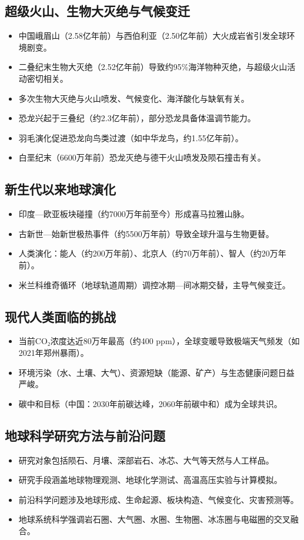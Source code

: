 \documentclass[12pt,a4paper]{article}
\begin{document}
	\subsection{超级火山、生物大灭绝与气候变迁}
	\begin{itemize}
		\item 中国峨眉山（2.58亿年前）与西伯利亚（2.50亿年前）大火成岩省引发全球环境剧变。
		\item 二叠纪末生物大灭绝（2.52亿年前）导致约95\%海洋物种灭绝，与超级火山活动密切相关。
		\item 多次生物大灭绝与火山喷发、气候变化、海洋酸化与缺氧有关。
		\item 恐龙兴起于三叠纪（约2.3亿年前），部分恐龙具备体温调节能力。
		\item 羽毛演化促进恐龙向鸟类过渡（如中华龙鸟，约1.55亿年前）。
		\item 白垩纪末（6600万年前）恐龙灭绝与德干火山喷发及陨石撞击有关。
	\end{itemize}
	
	\subsection{新生代以来地球演化}
	\begin{itemize}
		\item 印度—欧亚板块碰撞（约7000万年前至今）形成喜马拉雅山脉。
		\item 古新世—始新世极热事件（约5500万年前）导致全球升温与生物更替。
		\item 人类演化：能人（约200万年前）、北京人（约70万年前）、智人（约20万年前）。
		\item 米兰科维奇循环（地球轨道周期）调控冰期—间冰期交替，主导气候变迁。
	\end{itemize}
	
	\subsection{现代人类面临的挑战}
	\begin{itemize}
		\item 当前CO₂浓度达近80万年最高（约400 ppm），全球变暖导致极端天气频发（如2021年郑州暴雨）。
		\item 环境污染（水、土壤、大气）、资源短缺（能源、矿产）与生态健康问题日益严峻。
		\item 碳中和目标（中国：2030年前碳达峰，2060年前碳中和）成为全球共识。
	\end{itemize}
	
	\subsection{地球科学研究方法与前沿问题}
	\begin{itemize}
		\item 研究对象包括陨石、月壤、深部岩石、冰芯、大气等天然与人工样品。
		\item 研究手段涵盖地球物理观测、地球化学测试、高温高压实验与计算模拟。
		\item 前沿科学问题涉及地球形成、生命起源、板块构造、气候变化、灾害预测等。
		\item 地球系统科学强调岩石圈、大气圈、水圈、生物圈、冰冻圈与电磁圈的交叉融合。
	\end{itemize}
	
\end{document}

